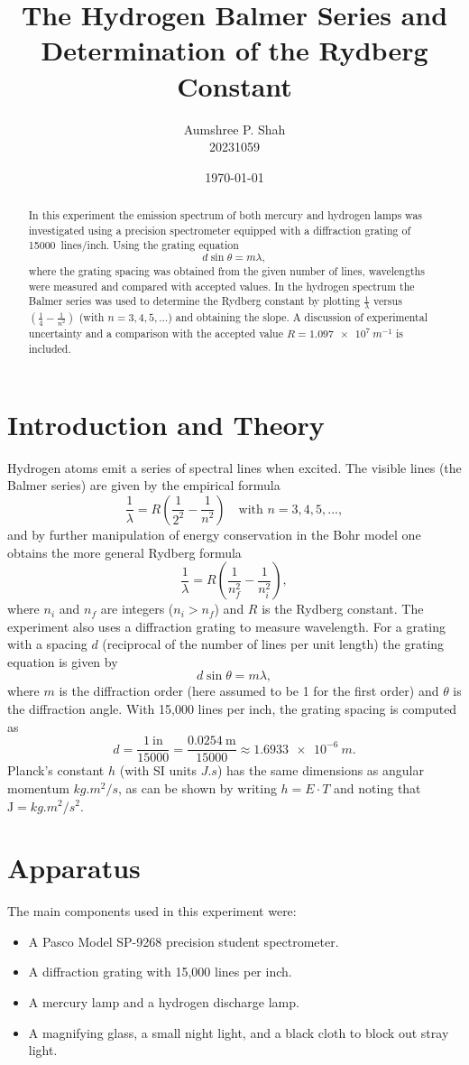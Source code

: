 \documentclass[12pt]{article}
\title{The Hydrogen Balmer Series and Determination of the Rydberg Constant}
\author{Aumshree P. Shah\\20231059}
\date{\today}
\begin{document}
\maketitle

\begin{abstract}
  In this experiment the emission spectrum of both mercury and hydrogen lamps was investigated using a precision spectrometer equipped with a diffraction grating of \SI{15000}{lines/inch}. Using the grating equation 
  \[
  d\sin\theta = m\lambda,
  \]
  where the grating spacing was obtained from the given number of lines, wavelengths were measured and compared with accepted values. In the hydrogen spectrum the Balmer series was used to determine the Rydberg constant by plotting \(\frac{1}{\lambda}\) versus \(\left(\frac{1}{4} - \frac{1}{n^2}\right)\) (with \(n=3,4,5,\ldots\)) and obtaining the slope. A discussion of experimental uncertainty and a comparison with the accepted value \(R = \SI{1.097e7}{m^{-1}}\) is included.
\end{abstract}
\vspace{2cm}
\section{Introduction and Theory}
Hydrogen atoms emit a series of spectral lines when excited. The visible lines (the Balmer series) are given by the empirical formula
\[
\frac{1}{\lambda} = R \left(\frac{1}{2^2} - \frac{1}{n^2}\right) \quad \text{with } n=3,4,5,\ldots,
\]
and by further manipulation of energy conservation in the Bohr model one obtains the more general Rydberg formula
\[
\frac{1}{\lambda} = R\left(\frac{1}{n_f^2} - \frac{1}{n_i^2}\right),
\]
where \(n_i\) and \(n_f\) are integers (\(n_i>n_f\)) and \(R\) is the Rydberg constant. The experiment also uses a diffraction grating to measure wavelength. For a grating with a spacing \(d\) (reciprocal of the number of lines per unit length) the grating equation is given by
\[
d\sin\theta = m\lambda,
\]
where \(m\) is the diffraction order (here assumed to be 1 for the first order) and \(\theta\) is the diffraction angle. With 15,000 lines per inch, the grating spacing is computed as
\[
d = \frac{1~\text{in}}{15000} = \frac{0.0254~\text{m}}{15000} \approx \SI{1.6933e-6}{m}.
\]
Planck's constant \(h\) (with SI units \(\si{J.s}\)) has the same dimensions as angular momentum \(\si{kg.m^2/s}\), as can be shown by writing \(h = E\cdot T\) and noting that \(\text{J}=\si{kg.m^2/s^2}\).

\section{Apparatus}
The main components used in this experiment were:
\begin{itemize}
  \item A Pasco Model SP-9268 precision student spectrometer.
  \item A diffraction grating with 15,000 lines per inch.
  \item A mercury lamp and a hydrogen discharge lamp.
  \item A magnifying glass, a small night light, and a black cloth to block out stray light.
\end{itemize}
\end{document}
